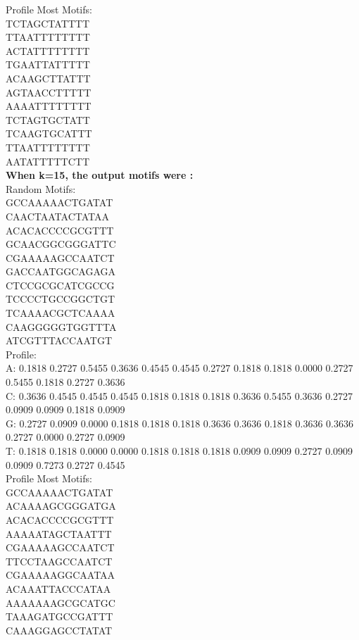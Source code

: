 \documentclass{report}
\begin{document}
Profile Most Motifs:\\
TCTAGCTATTTT\\
TTAATTTTTTTT\\
ACTATTTTTTTT\\
TGAATTATTTTT\\
ACAAGCTTATTT\\
AGTAACCTTTTT\\
AAAATTTTTTTT\\
TCTAGTGCTATT\\
TCAAGTGCATTT\\
TTAATTTTTTTT\\
AATATTTTTCTT\\
\textbf{When k=15, the output motifs were :}\\
Random Motifs:\\
GCCAAAAACTGATAT\\
CAACTAATACTATAA\\
ACACACCCCGCGTTT\\
GCAACGGCGGGATTC\\
CGAAAAAGCCAATCT\\
GACCAATGGCAGAGA\\
CTCCGCGCATCGCCG\\
TCCCCTGCCGGCTGT\\
TCAAAACGCTCAAAA\\
CAAGGGGGTGGTTTA\\
ATCGTTTACCAATGT\\

Profile:\\
A: 0.1818 0.2727 0.5455 0.3636 0.4545 0.4545 0.2727 0.1818 0.1818 0.0000 0.2727 0.5455 0.1818 0.2727 0.3636\\
C: 0.3636 0.4545 0.4545 0.4545 0.1818 0.1818 0.1818 0.3636 0.5455 0.3636 0.2727 0.0909 0.0909 0.1818 0.0909\\
G: 0.2727 0.0909 0.0000 0.1818 0.1818 0.1818 0.3636 0.3636 0.1818 0.3636 0.3636 0.2727 0.0000 0.2727 0.0909\\
T: 0.1818 0.1818 0.0000 0.0000 0.1818 0.1818 0.1818 0.0909 0.0909 0.2727 0.0909 0.0909 0.7273 0.2727 0.4545\\

Profile Most Motifs:\\
GCCAAAAACTGATAT\\
ACAAAAGCGGGATGA\\
ACACACCCCGCGTTT\\
AAAAATAGCTAATTT\\
CGAAAAAGCCAATCT\\
TTCCTAAGCCAATCT\\
CGAAAAAGGCAATAA\\
ACAAATTACCCATAA\\
AAAAAAAGCGCATGC\\
TAAAGATGCCGATTT\\
CAAAGGAGCCTATAT\\
\end{document}
